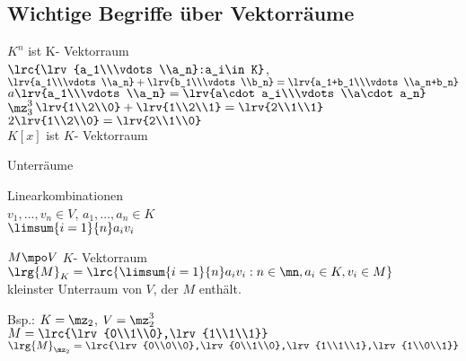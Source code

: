 \subsection{Wichtige Begriffe über Vektorräume}
		\item $K^n$ ist K- Vektorraum\\
		$\lrc{\lrv{a_1\\\vdots\\a_n}:a_i\in K}$, $\lrv{a_1\\\vdots\\a_n}+\lrv{b_1\\\vdots\\b_n}=
		\lrv{a_1+b_1\\\vdots\\a_n+b_n}$\\
		$a\lrv{a_1\\\vdots\\a_n}=\lrv{a\cdot a_i\\\vdots\\a\cdot a_n}$\\
		$\mz^3_3$\quad$\lrv{1\\2\\0}+\lrv{1\\2\\1}=\lrv{2\\1\\1}$\\
		$2\lrv{1\\2\\0}=\lrv{2\\1\\0}$\\
		$K[x]$ ist $K$- Vektorraum
		\item Unterräume
		\item Linearkombinationen\\
		$v_1,...,v_n\in V$, $a_1,...,a_n\in K$\\
		$\limsum{i=1}{n}a_iv_i$
		\item $M\mpo V$ $K$- Vektorraum\\
		$\lrg{M}_K=\lrc{\limsum{i=1}{n}a_iv_i:n\in\mn,a_i\in K,v_i\in M}$\\
		kleinster Unterraum von $V$, der $M$ enthält.

		Bsp.: $K=\mz_2$, $V=\mz^3_2$\\
		$M=\lrc{\lrv{0\\1\\0},\lrv{1\\1\\1}}$\\
		$\lrg{M}_{\mz_2}=\lrc{\lrv{0\\0\\0},\lrv{0\\1\\0},\lrv{1\\1\\1},\lrv{1\\0\\1}}$

